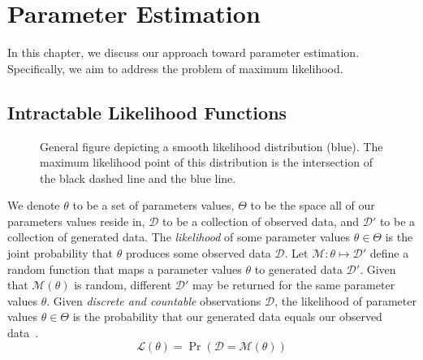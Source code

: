 \chapter{Parameter Estimation}\label{ch:parameterEstimation}
In this chapter, we discuss our approach toward parameter estimation.
Specifically, we aim to address the problem of maximum likelihood.

\section{Intractable Likelihood Functions}\label{sec:intractableLikelihoodFunctions}
\begin{figure}[t]
    \centering{}
    \caption{General figure depicting a smooth likelihood distribution (blue).
    The maximum likelihood point of this distribution is the intersection of the black dashed line and the blue line.
    }\label{fig:likelihoodGeneral}
\end{figure}

We denote $\theta$ to be a set of parameters values, $\Theta$ to be the space all of our parameters values reside in,
$\mathcal{D}$ to be a collection of observed data, and $\mathcal{D}'$ to
be a collection of generated data.
The \emph{likelihood} of some parameter values $\theta \in \Theta$ is the joint probability that $\theta$ produces
some observed data $\mathcal{D}$.
Let $\mathcal{M} : \theta \mapsto \mathcal{D}'$ define a random function that maps a parameter values $\theta$ to
generated data $\mathcal{D}'$.
Given that $\mathcal{M}(\theta)$ is random, different $\mathcal{D}'$ may be returned for the same parameter values
$\theta$.
Given \emph{discrete and countable} observations $\mathcal{D}$, the likelihood of parameter values $\theta \in \Theta$
is the probability that our generated data equals our observed data~\cite{lintusaariFundamentalsRecentDevelopments2017}.
\begin{equation}\label{eq:likelihood1}
    \mathcal{L}(\theta) = \Pr(\mathcal{D} = \mathcal{M}(\theta))
\end{equation}

